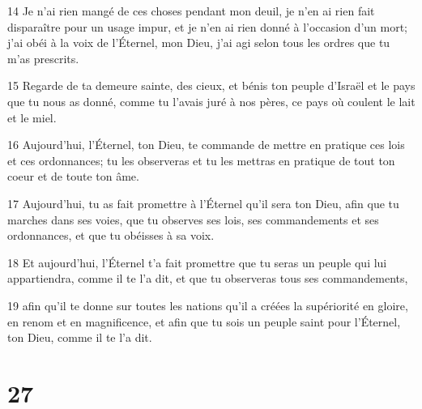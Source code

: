 \par 14 Je n'ai rien mangé de ces choses pendant mon deuil, je n'en ai rien fait disparaître pour un usage impur, et je n'en ai rien donné à l'occasion d'un mort; j'ai obéi à la voix de l'Éternel, mon Dieu, j'ai agi selon tous les ordres que tu m'as prescrits.
\par 15 Regarde de ta demeure sainte, des cieux, et bénis ton peuple d'Israël et le pays que tu nous as donné, comme tu l'avais juré à nos pères, ce pays où coulent le lait et le miel.
\par 16 Aujourd'hui, l'Éternel, ton Dieu, te commande de mettre en pratique ces lois et ces ordonnances; tu les observeras et tu les mettras en pratique de tout ton coeur et de toute ton âme.
\par 17 Aujourd'hui, tu as fait promettre à l'Éternel qu'il sera ton Dieu, afin que tu marches dans ses voies, que tu observes ses lois, ses commandements et ses ordonnances, et que tu obéisses à sa voix.
\par 18 Et aujourd'hui, l'Éternel t'a fait promettre que tu seras un peuple qui lui appartiendra, comme il te l'a dit, et que tu observeras tous ses commandements,
\par 19 afin qu'il te donne sur toutes les nations qu'il a créées la supériorité en gloire, en renom et en magnificence, et afin que tu sois un peuple saint pour l'Éternel, ton Dieu, comme il te l'a dit.

\chapter{27}

